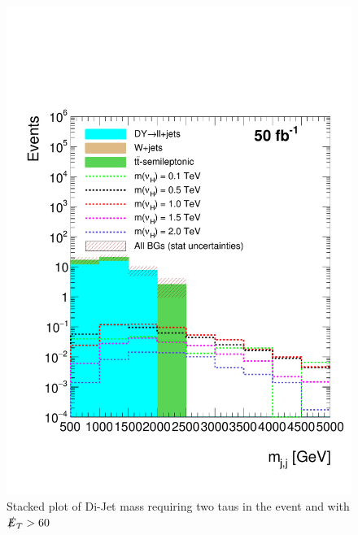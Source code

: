 \begin{figure}[htbp!]
\centering
\includegraphics[width=0.9\linewidth]{StackPlots/mjj_2Taus_met60_50ifb_2moreSignals.pdf}
\caption{Stacked plot of Di-Jet mass requiring two taus in the event and with $\slashed{E}_{T} > 60$}
\label{fig: mjj2tauMet60}
\end{figure}

